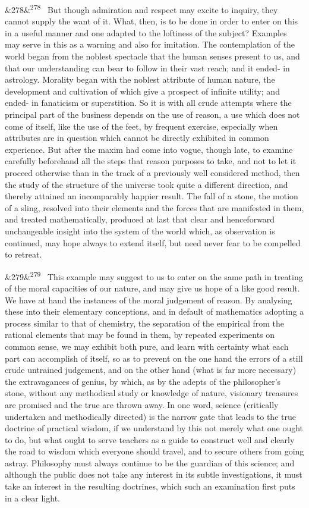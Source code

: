 \documentclass[12pt]{article}
\newcommand{\para}[1][]{\par\noindent\ifx&#1&\else\textsuperscript{\footnotesize #1}~\fi}
\begin{document}
\para[278] But though admiration and respect may excite to inquiry, they cannot supply the want of it. What, then, is to be done in order to enter on this in a useful manner and one adapted to the loftiness of the subject? Examples may serve in this as a warning and also for imitation. The contemplation of the world began from the noblest spectacle that the human senses present to us, and that our understanding can bear to follow in their vast reach; and it ended- in astrology. Morality began with the noblest attribute of human nature, the development and cultivation of which give a prospect of infinite utility; and ended- in fanaticism or superstition. So it is with all crude attempts where the principal part of the business depends on the use of reason, a use which does not come of itself, like the use of the feet, by frequent exercise, especially when attributes are in question which cannot be directly exhibited in common experience. But after the maxim had come into vogue, though late, to examine carefully beforehand all the steps that reason purposes to take, and not to let it proceed otherwise than in the track of a previously well considered method, then the study of the structure of the universe took quite a different direction, and thereby attained an incomparably happier result. The fall of a stone, the motion of a sling, resolved into their elements and the forces that are manifested in them, and treated mathematically, produced at last that clear and henceforward unchangeable insight into the system of the world which, as observation is continued, may hope always to extend itself, but need never fear to be compelled to retreat.

\para[279] This example may suggest to us to enter on the same path in treating of the moral capacities of our nature, and may give us hope of a like good result. We have at hand the instances of the moral judgement of reason. By analysing these into their elementary conceptions, and in default of mathematics adopting a process similar to that of chemistry, the separation of the empirical from the rational elements that may be found in them, by repeated experiments on common sense, we may exhibit both pure, and learn with certainty what each part can accomplish of itself, so as to prevent on the one hand the errors of a still crude untrained judgement, and on the other hand (what is far more necessary) the extravagances of genius, by which, as by the adepts of the philosopher's stone, without any methodical study or knowledge of nature, visionary treasures are promised and the true are thrown away. In one word, science (critically undertaken and methodically directed) is the narrow gate that leads to the true doctrine of practical wisdom, if we understand by this not merely what one ought to do, but what ought to serve teachers as a guide to construct well and clearly the road to wisdom which everyone should travel, and to secure others from going astray. Philosophy must always continue to be the guardian of this science; and although the public does not take any interest in its subtle investigations, it must take an interest in the resulting doctrines, which such an examination first puts in a clear light.
\end{document}
